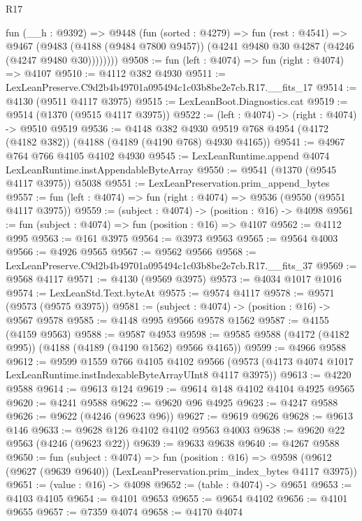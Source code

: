\begin{lexlean}{R17}
\begin{coremodule}
        fun (__h : @9392) =>
        @9448
          (fun (sorted : @4279) =>
          fun (rest : @4541) =>
          @9467
            (@9483
              (@4188 (@9484 @7800 @9457))
              (@4241 @9480 @30 @4287 (@4246 (@4247 @9480 @30))))))))
@9508 := fun (left : @4074) => fun (right : @4074) => @4107
@9510 := @4112 @382 @4930
@9511 := LexLeanPreserve.C9d2b4b49701a095494c1c03b8be2e7cb.R17.__fits_17
@9514 := @4130 (@9511 @4117 @3975)
@9515 := LexLeanBoot.Diagnostics.cat
@9519 := @9514 (@1370 (@9515 @4117 @3975))
@9522 := (left : @4074) -> (right : @4074) -> @9510 @9519
@9536 := @4148
    @382
    @4930
    @9519
    @768
    @4954
    (@4172 (@4182 @382))
    (@4188 (@4189 (@4190 @768) @4930 @4165))
@9541 := @4967 @764 @766 @4105 @4102 @4930
@9545 := LexLeanRuntime.append @4074 LexLeanRuntime.instAppendableByteArray
@9550 := @9541 (@1370 (@9545 @4117 @3975)) @5038
@9551 := LexLeanPreservation.prim_append_bytes
@9557 := fun (left : @4074) => fun (right : @4074) => @9536 (@9550 (@9551 @4117 @3975))
@9559 := (subject : @4074) -> (position : @16) -> @4098
@9561 := fun (subject : @4074) => fun (position : @16) => @4107
@9562 := @4112 @995
@9563 := @161 @3975
@9564 := @3973 @9563
@9565 := @9564 @4003
@9566 := @4926 @9565
@9567 := @9562 @9566
@9568 := LexLeanPreserve.C9d2b4b49701a095494c1c03b8be2e7cb.R17.__fits_37
@9569 := @9568 @4117
@9571 := @4130 (@9569 @3975)
@9573 := @4034 @1017 @1016
@9574 := LexLeanStd.Text.byteAt
@9575 := @9574 @4117
@9578 := @9571 (@9573 (@9575 @3975))
@9581 := (subject : @4074) -> (position : @16) -> @9567 @9578
@9585 := @4148 @995 @9566 @9578 @1562
@9587 := @4155 (@4159 @9563)
@9588 := @9587 @4953
@9598 := @9585 @9588 (@4172 (@4182 @995)) (@4188 (@4189 (@4190 @1562) @9566 @4165))
@9599 := @4966 @9588
@9612 := @9599
    @1559
    @766
    @4105
    @4102
    @9566
    (@9573 (@4173 @4074 @1017 LexLeanRuntime.instIndexableByteArrayUInt8 @4117 @3975))
@9613 := @4220 @9588
@9614 := @9613 @124
@9619 := @9614 @148 @4102 @4104 @4925 @9565
@9620 := @4241 @9588
@9622 := @9620 @96 @4925
@9623 := @4247 @9588
@9626 := @9622 (@4246 (@9623 @96))
@9627 := @9619 @9626
@9628 := @9613 @146
@9633 := @9628 @126 @4102 @4102 @9563 @4003
@9638 := @9620 @22 @9563 (@4246 (@9623 @22))
@9639 := @9633 @9638
@9640 := @4267 @9588
@9650 := fun (subject : @4074) =>
  fun (position : @16) =>
  @9598 (@9612 (@9627 (@9639 @9640)) (LexLeanPreservation.prim_index_bytes @4117 @3975))
@9651 := (value : @16) -> @4098
@9652 := (table : @4074) -> @9651
@9653 := @4103 @4105
@9654 := @4101 @9653
@9655 := @9654 @4102
@9656 := @4101 @9655
@9657 := @7359 @4074
@9658 := @4170 @4074

\end{coremodule}
\end{lexlean}
